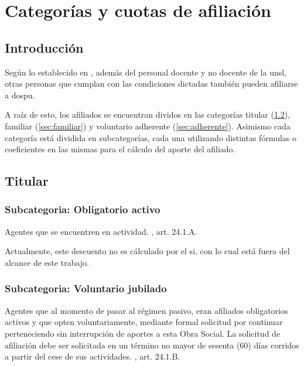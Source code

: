 \chapter{Categorías y cuotas de afiliación}

\section{Introducción}
Según lo establecido en \cite{CSOrd53}, además del personal docente y no docente de la \acrfull{unsl}, otras personas que cumplan con las condiciones dictadas también pueden afiliarse a \acrshort{dospu}.

A raíz de esto, los afiliados se encuentran dividos en las categorías titular (\cref{sec:titular}), familiar (\cref{sec:familiar}) y voluntario adherente (\cref{sec:adherente}). Asimismo cada categoría está dividida en subcategorías, cada una utilizando distintas fórmulas o coeficientes en las mismas para el cálculo del aporte del afiliado.

\section{Titular} \label{sec:titular}

\subsection{Subcategoria: Obligatorio activo}
\begin{displayquote}
Agentes que se encuentren en actividad.
\hfill\parencite{CSOrd53}, art. 24.1.A.
\end{displayquote}

Actualmente, este descuento no es cálculado por el \acrshort{si}, con lo cual está fuera del alcance de este trabajo.

\subsection{Subcategoria: Voluntario jubilado}
\begin{displayquote}
Agentes que al momento de pasar al régimen pasivo, eran afiliados obligatorios activos y
que opten voluntariamente, mediante formal solicitud por continuar perteneciendo sin
interrupción de aportes a esta Obra Social. La solicitud de afiliación debe ser solicitada en
un término no mayor de sesenta (60) días corridos a partir del cese de sus actividades. \hfill\parencite{CSOrd53}, art. 24.1.B. 
\end{displayquote}

